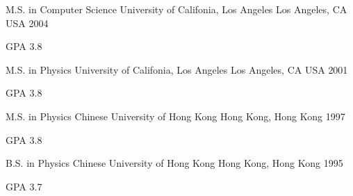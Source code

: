 

\begin{cventries}

  \cventry
    {M.S. in Computer Science} %
    {University of Califonia, Los Angeles} %
    {Los Angeles, CA USA} %
    {2004} %
    {
      \begin{cvitems} %
        \item {GPA 3.8}
      \end{cvitems}
    }

	\cventry
    {M.S. in Physics} %
    {University of Califonia, Los Angeles} %
    {Los Angeles, CA USA} %
    {2001} %
    {
      \begin{cvitems} %
        \item {GPA 3.8}
      \end{cvitems}
    }	
	
	\cventry
    {M.S. in Physics} %
    {Chinese University of Hong Kong} %
    {Hong Kong, Hong Kong} %
    {1997} %
    {
      \begin{cvitems} %
        \item {GPA 3.8}
      \end{cvitems}
    }	

	\cventry
    {B.S. in Physics} %
    {Chinese University of Hong Kong} %
    {Hong Kong, Hong Kong} %
    {1995} %
    {
      \begin{cvitems} %
        \item {GPA 3.7}
      \end{cvitems}
    }	

\end{cventries}
